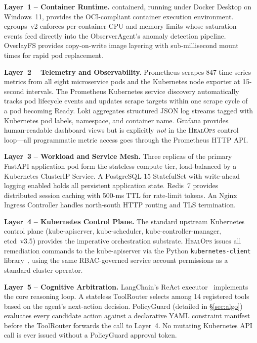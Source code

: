 \documentclass[journal,10pt,twoside]{IEEEtran}
\newcommand{\HealOps}{\textsc{HealOps}}
\begin{document}
\textbf{Layer~1 -- Container Runtime.}
containerd, running under Docker Desktop on Windows~11, provides the
OCI-compliant container execution environment. cgroups~v2 enforces
per-container CPU and memory limits whose saturation events feed directly
into the ObserverAgent's anomaly detection pipeline. OverlayFS provides
copy-on-write image layering with sub-millisecond mount times for rapid
pod replacement.

\textbf{Layer~2 -- Telemetry and Observability.}
Prometheus scrapes 847 time-series metrics from all eight microservice
pods and the Kubernetes node exporter at 15-second intervals. The
Prometheus Kubernetes service discovery automatically tracks pod lifecycle
events and updates scrape targets within one scrape cycle of a pod
becoming Ready. Loki aggregates structured JSON log streams tagged
with Kubernetes pod labels, namespace, and container name. Grafana
provides human-readable dashboard views but is explicitly \emph{not}
in the \HealOps{} control loop---all programmatic metric access goes
through the Prometheus HTTP API.

\textbf{Layer~3 -- Workload and Service Mesh.}
Three replicas of the primary FastAPI application pod form the stateless
compute tier, load-balanced by a Kubernetes ClusterIP Service. A
PostgreSQL 15 StatefulSet with write-ahead logging enabled holds all
persistent application state. Redis~7 provides distributed session
caching with 500-ms TTL for rate-limit tokens. An Nginx Ingress
Controller handles north-south HTTP routing and TLS termination.

\textbf{Layer~4 -- Kubernetes Control Plane.}
The standard upstream Kubernetes control plane (kube-apiserver,
kube-scheduler, kube-controller-manager, etcd~v3.5) provides the
imperative orchestration substrate. \HealOps{} issues all remediation
commands to the kube-apiserver via the Python \texttt{kubernetes-client}
library~\cite{k8sclient2024}, using the same RBAC-governed service
account permissions as a standard cluster operator.

\textbf{Layer~5 -- Cognitive Arbitration.}
LangChain's ReAct executor~\cite{langchain2024} implements the core
reasoning loop. A stateless ToolRouter selects among 14 registered tools
based on the agent's next-action decision. PolicyGuard (detailed in
\S\ref{sec:algo}) evaluates every candidate action against a declarative
YAML constraint manifest before the ToolRouter forwards the call to
Layer~4. No mutating Kubernetes API call is ever issued without a
PolicyGuard approval token.
\end{document}
